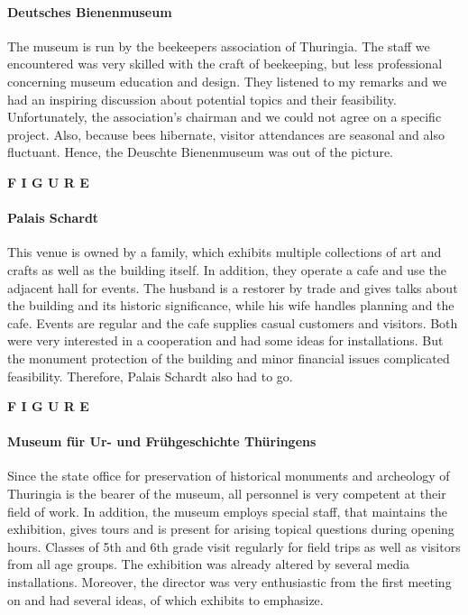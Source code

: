 \paragraph{Deutsches Bienenmuseum} 

The museum is run by the beekeepers association of Thuringia. The staff we encountered was very skilled with the craft of beekeeping, but less professional concerning museum education and design. They listened to my remarks and we had an inspiring discussion about potential topics and their feasibility. Unfortunately, the association's chairman and we could not agree on a specific project. Also, because bees hibernate, visitor attendances are seasonal and also fluctuant. Hence, the Deuschte Bienenmuseum was out of the picture.

\textbf{F I G U R E}

\paragraph{Palais Schardt} 

This venue is owned by a family, which exhibits multiple collections of art and crafts as well as the building itself. In addition, they operate a cafe and use the adjacent hall for events. The husband is a restorer by trade and gives talks about the building and its historic significance, while his wife handles planning and the cafe. Events are regular and the cafe supplies casual customers and visitors. Both were very interested in a cooperation and had some ideas for installations. But the monument protection of the building and minor financial issues complicated feasibility. Therefore, Palais Schardt also had to go. 

\textbf{F I G U R E}

\paragraph{Museum für Ur- und Frühgeschichte Thüringens} 

Since the state office for preservation of historical monuments and archeology of Thuringia is the bearer of the museum, all personnel is very competent at their field of work. In addition, the museum employs special staff, that maintains the exhibition, gives tours and is present for arising topical questions during opening hours. Classes of 5th and 6th grade visit regularly for field trips as well as visitors from all age groups. The exhibition was already altered by several media installations. Moreover, the director was very enthusiastic from the first meeting on and had several ideas, of which exhibits to emphasize.

